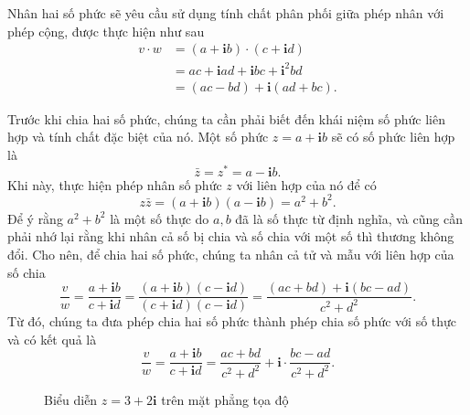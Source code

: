 \documentclass[a4paper, titlepage, openany]{book}
\numberwithin{equation}{chapter}
\begin{document}
Nhân hai số phức sẽ yêu cầu sử dụng tính chất phân phối giữa phép nhân với phép cộng, được thực hiện như sau
\begin{align*}
   v\cdot w&=\left(a + \mathbf{i}b\right)\cdot\left(c + \mathbf{i}d\right) \\
      &= ac + \mathbf{i}ad + \mathbf{i}bc + \mathbf{i}^2 bd \\
      &= (ac - bd) + \mathbf{i}(ad + bc).
\end{align*}

Trước khi chia hai số phức, chúng ta cần phải biết đến khái niệm số phức liên hợp và tính chất đặc biệt của nó. Một số phức $z = a+\mathbf{i}b$ sẽ có số phức liên hợp là $$\bar{z} = z^* = a - \mathbf{i}b.$$ Khi này, thực hiện phép nhân số phức $z$ với liên hợp của nó để có $$z\bar{z} = (a+\mathbf{i}b)(a-\mathbf{i}b) = a^2 + b^2.$$ Để ý rằng $a^2 + b^2$ là một số thực do $a, b$ đã là số thực từ định nghĩa, và cũng cần phải nhớ lại rằng khi nhân cả số bị chia và số chia với một số thì thương không đổi. Cho nên, để chia hai số phức, chúng ta nhân cả tử và mẫu với liên hợp của số chia $$\frac{v}{w} = \frac{a + \mathbf{i}b}{c + \mathbf{i}d} = \frac{\left(a + \mathbf{i}b\right)\left(c - \mathbf{i}d\right)}{\left(c + \mathbf{i}d\right)\left(c - \mathbf{i}d\right)} = \frac{\left(ac+bd\right) + \mathbf{i}\left(bc - ad\right)}{c^2+d^2}.$$ Từ đó, chúng ta đưa phép chia hai số phức thành phép chia số phức với số thực và có kết quả là $$\frac{v}{w} = \frac{a + \mathbf{i}b}{c + \mathbf{i}d} = \frac{ac+bd}{c^2+d^2}+\mathbf{i}\cdot\frac{bc - ad}{c^2+d^2}.$$

\begin{wrapfigure}{R}{0.5\textwidth}
   \centering

   \caption{Biểu diễn $z = 3 + 2\mathbf{i}$ trên mặt phẳng tọa độ}
   \label{fig:bieu_dien_so_phuc}
\end{wrapfigure}
\end{document}
